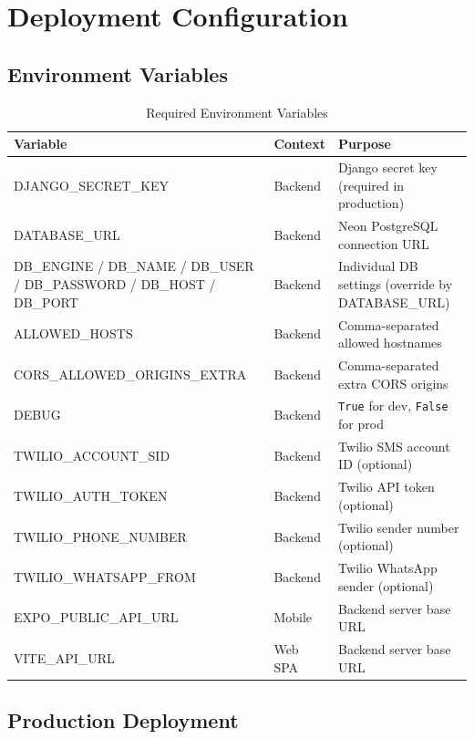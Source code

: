 \documentclass[12pt, a4paper]{report}
\begin{document}
\chapter{Deployment Configuration}

\section{Environment Variables}

\begin{table}[H]
\centering
\caption{Required Environment Variables}
\begin{tabularx}{\textwidth}{>{\ttfamily\raggedright\arraybackslash}p{} l X}
\toprule
\textbf{Variable} & \textbf{Context} & \textbf{Purpose} \\
\midrule
DJANGO\_SECRET\_KEY & Backend & Django secret key (required in production) \\
DATABASE\_URL & Backend & Neon PostgreSQL connection URL \\
DB\_ENGINE / DB\_NAME / DB\_USER / DB\_PASSWORD / DB\_HOST / DB\_PORT & Backend & Individual DB settings (override by DATABASE\_URL) \\
ALLOWED\_HOSTS & Backend & Comma-separated allowed hostnames \\
CORS\_ALLOWED\_ORIGINS\_EXTRA & Backend & Comma-separated extra CORS origins \\
DEBUG & Backend & \texttt{True} for dev, \texttt{False} for prod \\
TWILIO\_ACCOUNT\_SID & Backend & Twilio SMS account ID (optional) \\
TWILIO\_AUTH\_TOKEN & Backend & Twilio API token (optional) \\
TWILIO\_PHONE\_NUMBER & Backend & Twilio sender number (optional) \\
TWILIO\_WHATSAPP\_FROM & Backend & Twilio WhatsApp sender (optional) \\
EXPO\_PUBLIC\_API\_URL & Mobile & Backend server base URL \\
VITE\_API\_URL & Web SPA & Backend server base URL \\
\bottomrule
\end{tabularx}
\end{table}

\section{Production Deployment}
\end{document}
